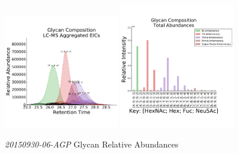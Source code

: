     \begin{figure}[!htbp]
        \centering
        \includegraphics[width=0.45\textwidth,valign=t]{figure/agp_chromatograms.pdf}
        \includegraphics[width=0.45\textwidth,valign=t]{figure/agp_abundances.pdf}
        \caption{\textit{20150930-06-AGP} Glycan Relative Abundances}
        \label{fig:agp_aggregated_eics}
    \end{figure}

